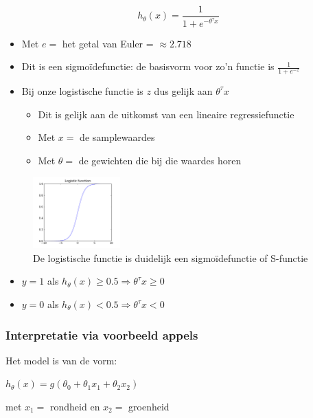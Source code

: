\documentclass{article}
\begin{document}
\begin{equation}
h_{\theta}(x) = \frac{1}{1 + e^{-\theta^{\tau}x}}
\end{equation}

\begin{itemize}
    \item Met $e =$ het getal van Euler = $\approx 2.718$
    \item Dit is een sigmoïdefunctie: de basisvorm voor zo'n functie is $\frac{1}{1+e^{-z}}$
    \item Bij onze logistische functie is $z$ dus gelijk aan $\theta^{\tau}x$
    \begin{itemize}
        \item Dit is gelijk aan de uitkomst van een lineaire regressiefunctie
        \item Met $x =$ de samplewaardes
        \item Met $\theta =$ de gewichten die bij die waardes horen 
    \end{itemize}
\end{itemize}

\begin{figure}[H]
    \centering
    \includegraphics[width=0.3\textwidth]{logistic-regression.png}
    \caption{De logistische functie is duidelijk een sigmoïdefunctie of S-functie}
\end{figure}

\begin{itemize}
    \item $y=1$ als $h_{\theta}(x) \geq 0.5 \Rightarrow \theta^{\tau}x \geq 0$
    \item $y=0$ als $h_{\theta}(x) < 0.5 \Rightarrow \theta^{\tau}x < 0$
\end{itemize}

\subsubsection{Interpretatie via voorbeeld appels}

Het model is van de vorm:

\begin{center}
    $h_{\theta}(x) = g(\theta_0 + \theta_1x_1 + \theta_2x_2)$

    met $x_1=$ rondheid en $x_2=$ groenheid
\end{center}
\end{document}

